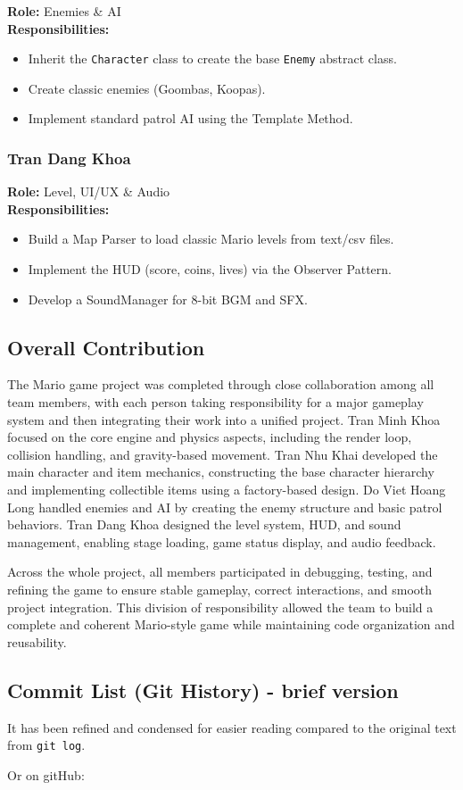 \textbf{Role:} Enemies \& AI \\
\textbf{Responsibilities:}
\begin{itemize}
    \item Inherit the \texttt{Character} class to create the base \texttt{Enemy} abstract class.
    \item Create classic enemies (Goombas, Koopas).
    \item Implement standard patrol AI using the Template Method.
\end{itemize}

\subsubsection{Tran Dang Khoa}

\textbf{Role:} Level, UI/UX \& Audio \\
\textbf{Responsibilities:}
\begin{itemize}
    \item Build a Map Parser to load classic Mario levels from text/csv files.
    \item Implement the HUD (score, coins, lives) via the Observer Pattern.
    \item Develop a SoundManager for 8-bit BGM and SFX.
\end{itemize}

\subsection{Overall Contribution}
The Mario game project was completed through close collaboration among all team members, with each person taking responsibility for a major gameplay system and then integrating their work into a unified project. Tran Minh Khoa focused on the core engine and physics aspects, including the render loop, collision handling, and gravity-based movement. Tran Nhu Khai developed the main character and item mechanics, constructing the base character hierarchy and implementing collectible items using a factory-based design. Do Viet Hoang Long handled enemies and AI by creating the enemy structure and basic patrol behaviors. Tran Dang Khoa designed the level system, HUD, and sound management, enabling stage loading, game status display, and audio feedback.

Across the whole project, all members participated in debugging, testing, and refining the game to ensure stable gameplay, correct interactions, and smooth project integration. This division of responsibility allowed the team to build a complete and coherent Mario-style game while maintaining code organization and reusability.

\subsection{Commit List (Git History) - brief version}

It has been refined and condensed for easier reading compared to the original text from \texttt{git log}.

Or  on gitHub:
\href{https://github.com/trannhukhai98438/CS202-Group03-2DGame.git}{
}